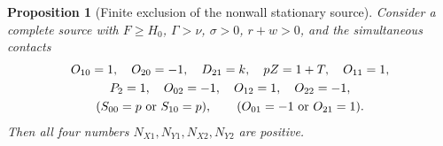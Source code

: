 \documentclass[11pt,reqno]{amsart}
\newtheorem{proposition}[theorem]{Proposition}
\theoremstyle{definition}
\theoremstyle{remark}
\begin{document}
\begin{proposition}[Finite exclusion of the nonwall stationary source]
\label{s3:wall-C19-finite}
Consider a complete source with \(F\ge H_0\), \(\Gamma>\nu\),
\(\sigma>0\), \(r+w>0\), and the simultaneous contacts
\begin{equation}\label{s3:wall-C19-contacts}
\begin{gathered}
 O_{10}=1,\quad O_{20}=-1,\quad D_{21}=k,\quad pZ=1+T,\quad O_{11}=1,\\
 P_2=1,\quad O_{02}=-1,\quad O_{12}=1,\quad O_{22}=-1,\\
 (S_{00}=p\ \hbox{or}\ S_{10}=p),\qquad
 (O_{01}=-1\ \hbox{or}\ O_{21}=1).
\end{gathered}
\end{equation}
Then all four numbers \(N_{X1},N_{Y1},N_{X2},N_{Y2}\) are positive.
\end{proposition}
\end{document}
